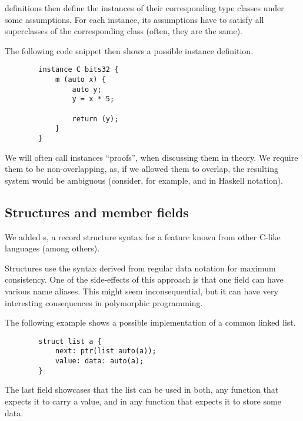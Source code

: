  definitions then define the instances of their corresponding type classes under some assumptions. For each instance, its assumptions have to satisfy all superclasses of the corresponding class (often, they are the same).

\begin{ex}[Instance]
    The following code snippet then shows a possible instance definition.

    \begin{lstlisting}
        instance C bits32 {
            m (auto x) {
                auto y;
                y = x * 5;

                return (y);
            }
        }
    \end{lstlisting}
\end{ex}

We will often call instances ``proofs'', when discussing them in theory. We require them to be non-overlapping, as, if we allowed them to overlap, the resulting system would be ambiguous (consider, for example,  and  in Haskell notation).

\subsection{Structures and member fields}

We added s, a record structure syntax for a feature known from other C-like languages (among others).

Structures use the syntax derived from regular data notation for maximum consistency. One of the side-effects of this approach is that one field can have various name aliases. This might seem inconsequential, but it can have very interesting consequences in polymorphic programming.

\begin{ex}
    \label{list_ex}
    The following example shows a possible implementation of a common linked list.

    \begin{lstlisting}
        struct list a {
            next: ptr(list auto(a));
            value: data: auto(a);
        }
    \end{lstlisting}

    The last field showcases that the list can be used in both, any function that expects it to carry a value, and in any function that expects it to store some data.
\end{ex}

